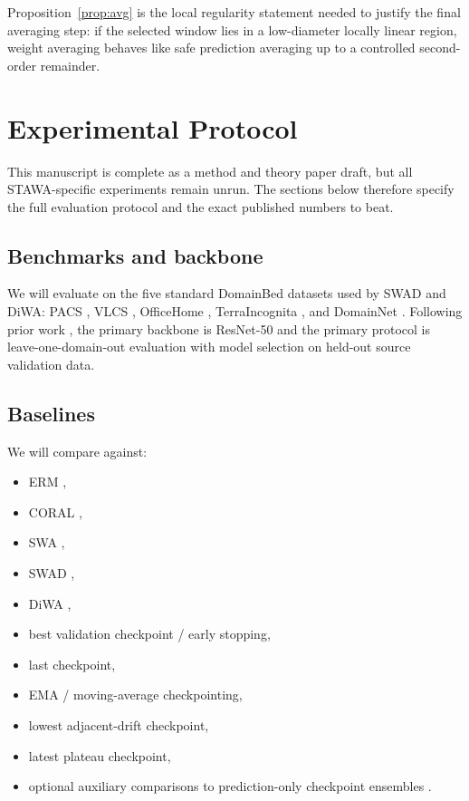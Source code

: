 \documentclass{article}
\newcommand{\stawa}{\textup{\textsc{STAWA}}}
\newcommand{\swad}{\textup{\textsc{SWAD}}}
\begin{document}
Proposition~\ref{prop:avg} is the local regularity statement needed to justify the final averaging step: if the selected window lies in a low-diameter locally linear region, weight averaging behaves like safe prediction averaging up to a controlled second-order remainder.

\section{Experimental Protocol}
\label{sec:experiments}

This manuscript is complete as a method and theory paper draft, but all \stawa{}-specific experiments remain unrun. The sections below therefore specify the full evaluation protocol and the exact published numbers to beat.

\subsection{Benchmarks and backbone}

We will evaluate on the five standard DomainBed datasets used by \swad{} and DiWA: PACS \citep{li2017pacs}, VLCS \citep{fang2013vlcs}, OfficeHome \citep{venkateswara2017officehome}, TerraIncognita \citep{beery2018terraincognita}, and DomainNet \citep{peng2019domainnet}. Following prior work \citep{cha2021wad,rame2022diwa,gulrajani2021in}, the primary backbone is ResNet-50 and the primary protocol is leave-one-domain-out evaluation with model selection on held-out source validation data.

\subsection{Baselines}

We will compare against:
\begin{itemize}[leftmargin=1.4em]
    \item ERM \citep{gulrajani2021in},
    \item CORAL \citep{sun2016coral},
    \item SWA \citep{izmailov2018swa},
    \item \swad{} \citep{cha2021wad},
    \item DiWA \citep{rame2022diwa},
    \item best validation checkpoint / early stopping,
    \item last checkpoint,
    \item EMA / moving-average checkpointing,
    \item lowest adjacent-drift checkpoint,
    \item latest plateau checkpoint,
    \item optional auxiliary comparisons to prediction-only checkpoint ensembles \citep{chen2017checkpoint}.
\end{itemize}
\end{document}
